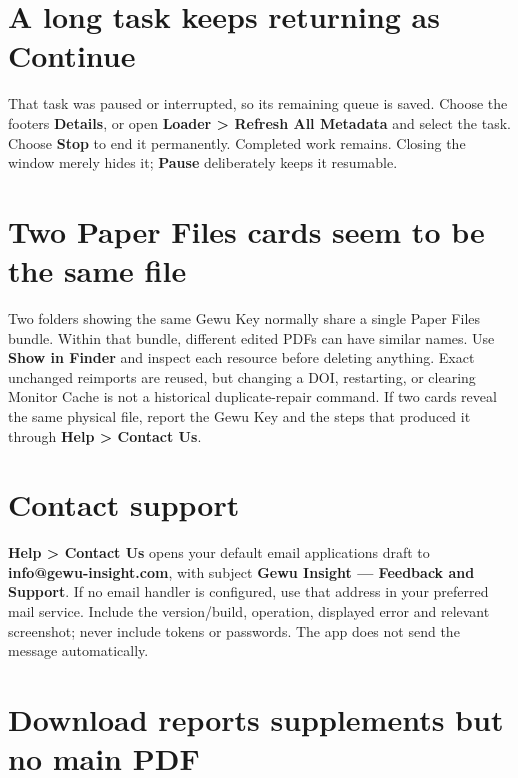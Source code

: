 \documentclass[10pt,letterpaper,oneside]{scrreprt}
\begin{document}
\section{A long task keeps returning as Continue}\label{a-long-task-keeps-returning-as-continue}

That task was paused or interrupted, so its remaining queue is saved. Choose the footer\textquotesingle s \textbf{Details}, or open \textbf{Loader \textgreater{} Refresh All Metadata} and select the task. Choose \textbf{Stop} to end it permanently. Completed work remains. Closing the window merely hides it; \textbf{Pause} deliberately keeps it resumable.

\section{Two Paper Files cards seem to be the same file}\label{two-paper-files-cards-seem-to-be-the-same-file}

Two folders showing the same Gewu Key normally share a single Paper Files bundle. Within that bundle, different edited PDFs can have similar names. Use \textbf{Show in Finder} and inspect each resource before deleting anything. Exact unchanged reimports are reused, but changing a DOI, restarting, or clearing Monitor Cache is not a historical duplicate-repair command. If two cards reveal the same physical file, report the Gewu Key and the steps that produced it through \textbf{Help \textgreater{} Contact Us}.

\section{Contact support}\label{contact-support}

\textbf{Help \textgreater{} Contact Us} opens your default email application\textquotesingle s draft to \textbf{info@gewu-insight.com}, with subject \textbf{Gewu Insight --- Feedback and Support}. If no email handler is configured, use that address in your preferred mail service. Include the version/build, operation, displayed error and relevant screenshot; never include tokens or passwords. The app does not send the message automatically.

\section{Download reports supplements but no main PDF}\label{download-reports-supplements-but-no-main-pdf}
\end{document}
